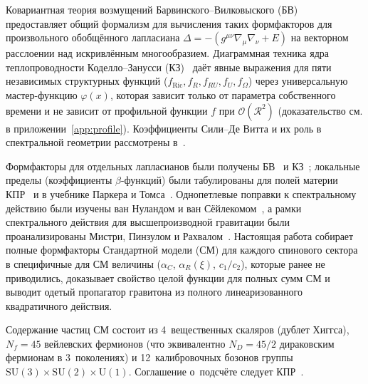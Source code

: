 \documentclass[aps,prd,twocolumn,superscriptaddress,nofootinbib,floatfix]{revtex4-2}
\theoremstyle{definition}
\theoremstyle{remark}
\begin{document}
Ковариантная теория возмущений Барвинского--Вилковыского
(БВ)~\cite{Barvinsky:1985an,Barvinsky:1987uw,Barvinsky:1990up,Barvinsky:2009gw}
предоставляет общий формализм для вычисления таких формфакторов для
произвольного обобщённого лапласиана
$\Delta = -(g^{\mu\nu}\nabla_\mu\nabla_\nu + E)$ на векторном расслоении
над искривлённым многообразием. Диаграммная техника ядра теплопроводности
Коделло--Занусси (КЗ)~\cite{Codello:2012kq} даёт явные выражения для пяти
независимых структурных функций
($f_{\text{Ric}}, f_R, f_{RU}, f_U, f_\Omega$) через универсальную
мастер-функцию $\varphi(x)$, которая зависит только от параметра собственного
времени и не зависит от профильной функции $f$ при
$\mathcal{O}(\mathcal{R}^2)$ (доказательство см. в приложении~\ref{app:profile}).
Коэффициенты Сили--Де Витта и их роль в спектральной геометрии
рассмотрены
в~\cite{DeWitt:1964mxt,Gilkey:1975iq,Vassilevich:2003xt,Avramidi:2000bm,Fursaev:2011zz}.

Формфакторы для отдельных лапласианов были получены
БВ~\cite{Barvinsky:1987uw,Barvinsky:1990up} и
КЗ~\cite{Codello:2012kq}; локальные пределы (коэффициенты $\beta$-функций)
были табулированы для полей материи КПР~\cite{Codello:2008vh} и в учебнике
Паркера и Томса~\cite{Parker:2009uva}. Однопетлевые поправки к спектральному
действию были изучены ван Нуландом и ван
Сёйлекомом~\cite{vanNuland:2022xkm}, а рамки спектрального действия для
высшепроизводной гравитации были проанализированы Мистри, Пинзулом и
Рахвалом~\cite{Mistry:2020xqh}. Настоящая работа собирает полные формфакторы
Стандартной модели (СМ) для каждого спинового сектора в специфичные для СМ
величины ($\alpha_C$, $\alpha_R(\xi)$, $c_1/c_2$), которые ранее не
приводились, доказывает свойство целой функции для полных сумм СМ и выводит
одетый пропагатор гравитона из полного линеаризованного квадратичного действия.

Содержание частиц СМ состоит из 4~вещественных скаляров (дублет Хиггса),
$N_f = 45$ вейлевских фермионов (что эквивалентно $N_D = 45/2$ дираковским
фермионам в 3~поколениях) и 12~калибровочных бозонов группы
$\mathrm{SU}(3) \times \mathrm{SU}(2) \times \mathrm{U}(1)$. Соглашение
о~подсчёте следует КПР~\cite{Codello:2008vh}.
\end{document}
